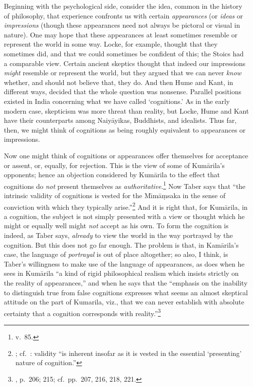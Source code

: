 ﻿\documentclass[11pt]{amsart}
\begin{document}
Beginning with the psychological side, consider the idea, common in the history of philosophy, that experience confronts us with certain \emph{appearances} (or \emph{ideas} or \emph{impressions} (though these appearances need not always be pictoral or visual in nature). One may hope that these appearances at least sometimes resemble or represent the world in some way. Locke, for example, thought that they sometimes did, and that we could sometimes be confident of this; the Stoics had a comparable view. Certain ancient skeptics thought that indeed our impressions \emph{might} resemble or represent the world, but they argued that we can never \emph{know} whether, and should not believe that, they do. And then Hume and Kant, in different ways, decided that the whole question was nonsense. Parallel positions existed in India concerning what we have called `cognitions.' As in the early modern case, skepticism was more threat than reality, but Locke, Hume and Kant have their counterparts among Naiy\=ayikas, Buddhists, and idealists. Thus far, then, we might think of cognitions as being roughly equivalent to appearances or impressions.

Now one might think of cognitions or appearances offer themselves for acceptance or assent, or, equally, for rejection. This is the view of some of Kum\=arila's opponents; hence an objection considered by Kum\=arila to the effect that cognitions do \emph{not} present themselves as \emph{authoritative}.\footnote{v.~85.} Now Taber says that ``the intrinsic validity of cognitions is vested for the M\={\i}m\=a\d msaka in the sense of conviction with which they typically arise.''\footnote{\citet[p.~172]{taber2002mo}; cf.~\citet[p.~203]{taber1987review}: validity ``is inherent insofar as it is vested in the essential `presenting' nature of cognition.''} And it is right that, for Kum\=arila, in a cognition, the subject is not simply presented with a view or thought which he might or equally well might \emph{not} accept as his own. To form the cognition is indeed, as Taber says, \emph{already} to view the world in the way portrayed by the cognition. But this does not go far enough. The problem is that, in Kam\=arila's case, the language of \emph{portrayal} is out of place altogether; so also, I think, is Taber's willingness to make use of the language of appearances, as does when he sees in Kum\=arila ``a kind of rigid philosophical realism which insists strictly on the reality of appearances,'' and when he says that the ``emphasis on the inability to distinguish true from false cognitions expresses what seems an almost skeptical attitude on the part of Kumarila, viz., that we can never establish with absolute certainty that a cognition corresponds with reality.''\footnote{\citet{taber1992dkb}, p.~206; 215; cf.~pp.~207, 216, 218, 221.}
\end{document}
